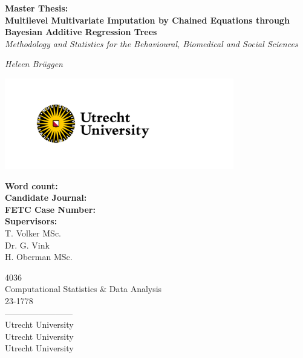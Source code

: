 \documentclass[10pt, a4paper, titlepage]{article}
\begin{document}
\begin{titlingpage}
\begin{center}
\Huge\textbf{Master Thesis:  \\ Multilevel Multivariate Imputation by Chained Equations through Bayesian Additive Regression Trees} \\
\Large\textit{Methodology and Statistics for the Behavioural, Biomedical and Social Sciences}

\vspace{.5cm}

\normalsize\textit{Heleen Brüggen}

\vspace{11.5cm}

\begin{minipage}{.5\textwidth}
\begin{center}
        \includegraphics[width=10cm]{graphs/UU_logo_2021_EN_RGB.png}
\end{center}
\end{minipage}%

\vspace{.25cm}

\begin{minipage}{0.5\textwidth}
\begin{flushleft}

\textbf{Word count:} \\
\textbf{Candidate Journal:} \\
\textbf{FETC Case Number:} \\
\textbf{Supervisors:} \\
T. Volker MSc. \\
Dr. G. Vink \\
H. Oberman MSc.
\end{flushleft}
\end{minipage}%
\begin{minipage}{0.5\textwidth}
\begin{flushright}

4036 \\ %
Computational Statistics \& Data Analysis \\
23-1778 \\
------------------------\\
Utrecht University \\
Utrecht University \\
Utrecht University
\end{flushright}
\end{minipage}

\end{center}
\end{titlingpage}
\end{document}
